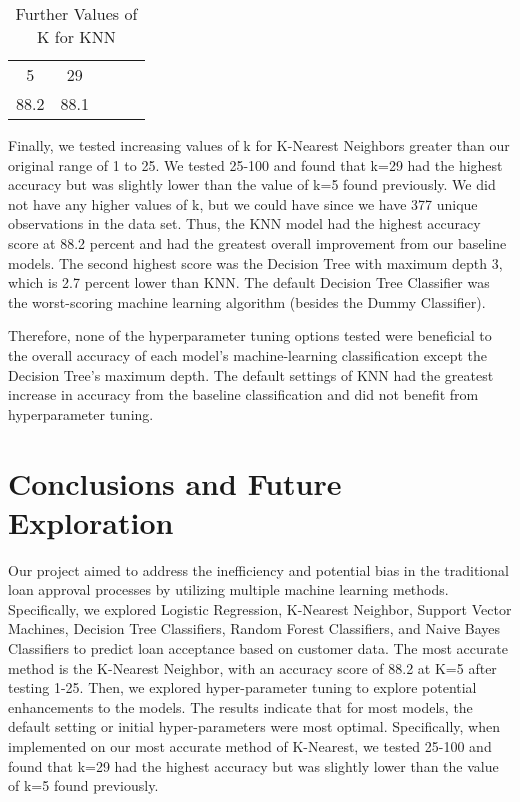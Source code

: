\documentclass{article}
\begin{document}
 \begin{table} [h]
    \centering
    \begin{tabular}{ccccc}
          5& 29\\
          88.2& 88.1\\
    \end{tabular}
    \caption{Further Values of K for KNN}
    \label{tab:my_label}
\end{table}
\FloatBarrier
Finally, we tested increasing values of k for K-Nearest Neighbors greater than our original range of 1 to 25. We tested 25-100 and found that k=29 had the highest accuracy but was slightly lower than the value of k=5 found previously. We did not have any higher values of k, but we could have since we have 377 unique observations in the data set. Thus, the KNN model had the highest accuracy score at 88.2 percent and had the greatest overall improvement from our baseline models. The second highest score was the Decision Tree with maximum depth 3, which is 2.7 percent lower than KNN. The default Decision Tree Classifier was the worst-scoring machine learning algorithm (besides the Dummy Classifier). 

Therefore, none of the hyperparameter tuning options tested were beneficial to the overall accuracy of each model's machine-learning classification except the Decision Tree's maximum depth. The default settings of KNN had the greatest increase in accuracy from the baseline classification and did not benefit from hyperparameter tuning. 

\section{Conclusions and Future Exploration}
Our project aimed to address the inefficiency and potential bias in the traditional loan approval processes by utilizing multiple machine learning methods. Specifically, we explored Logistic Regression, K-Nearest Neighbor, Support Vector Machines, Decision Tree Classifiers, Random Forest Classifiers, and Naive Bayes Classifiers to predict loan acceptance based on customer data. The most accurate method is the K-Nearest Neighbor, with an accuracy score of 88.2 at K=5 after testing 1-25.  Then, we explored hyper-parameter tuning to explore potential enhancements to the models. The results indicate that for most models, the default setting or initial hyper-parameters were most optimal. Specifically, when implemented on our most accurate method of K-Nearest, we tested 25-100 and found that k=29 had the highest accuracy but was slightly lower than the value of k=5 found previously.
\end{document}
